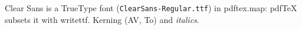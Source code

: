 \documentclass{article}
\begin{document}
Clear Sans is a TrueType font (\texttt{ClearSans-Regular.ttf}) in pdftex.map:
pdfTeX subsets it with writettf. Kerning (AV, To) and \textit{italics}.
\end{document}
